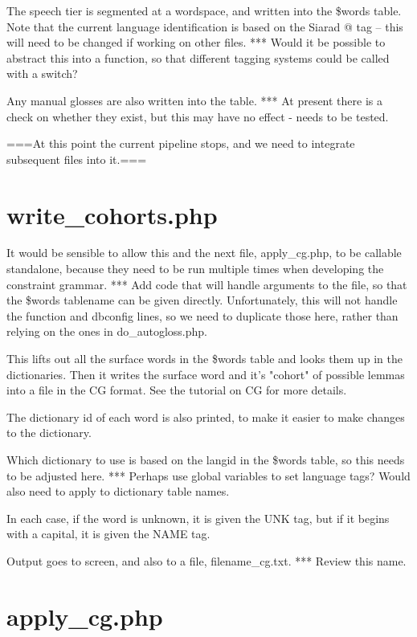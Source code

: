 \documentclass[a4paper,10pt]{article}
\begin{document}
The speech tier is segmented at a wordspace, and written into the \$words table.  Note that the current language identification is based on the Siarad @ tag -- this will need to be changed if working on other files.
*** Would it be possible to abstract this into a function, so that different tagging systems could be called with a switch?

Any manual glosses are also written into the table.
*** At present there is a check on whether they exist, but this may have no effect - needs to be tested.


===At this point the current pipeline stops, and we need to integrate subsequent files into it.===


\section{write\_cohorts.php}

It would be sensible to allow this and the next file, apply\_cg.php, to be callable standalone, because they need to be run multiple times when developing the constraint grammar.
*** Add code that will handle arguments to the file, so that the \$words tablename can be given directly.  Unfortunately, this will not handle the function and dbconfig lines, so we need to duplicate those here, rather than relying on the ones in do\_autogloss.php.

This lifts out all the surface words in the \$words table and looks them up in the dictionaries.  Then it writes the surface word and it's "cohort" of possible lemmas into a file in the CG format.  See the tutorial on CG for more details.

The dictionary id of each word is also printed, to make it easier to make changes to the dictionary.

Which dictionary to use is based on the langid in the \$words table, so this needs to be adjusted here.
*** Perhaps use global variables to set language tags?  Would also need to apply to dictionary table names.

In each case, if the word is unknown, it is given the UNK tag, but if it begins with a capital, it is given the NAME tag.

Output goes to screen, and also to a file, filename\_cg.txt.
*** Review this name.


\section{apply\_cg.php}
\end{document}
